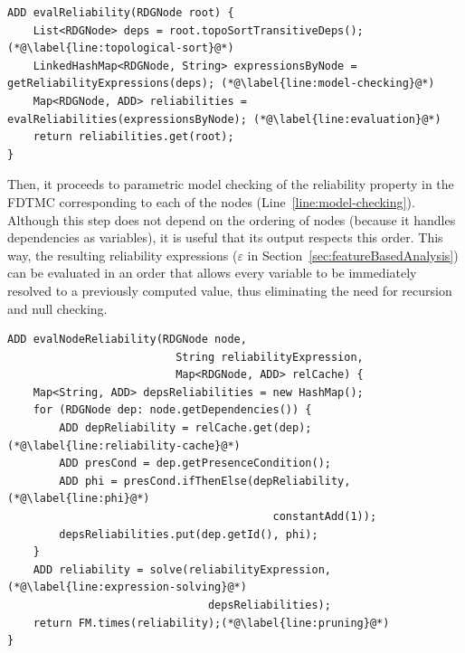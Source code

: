 \begin{lstlisting}[label={lst:evaluate-reliability},
                   caption={\textsc{ReAna}'s main evaluation routine},
                   float,
                   breaklines,
		   belowcaptionskip=0.1cm]
ADD evalReliability(RDGNode root) {
    List<RDGNode> deps = root.topoSortTransitiveDeps(); (*@\label{line:topological-sort}@*)
    LinkedHashMap<RDGNode, String> expressionsByNode = getReliabilityExpressions(deps); (*@\label{line:model-checking}@*)
    Map<RDGNode, ADD> reliabilities = evalReliabilities(expressionsByNode); (*@\label{line:evaluation}@*)
    return reliabilities.get(root);
}
\end{lstlisting}

Then, it proceeds to parametric model checking of the reliability property in
the FDTMC corresponding to each of the nodes (Line~\ref{line:model-checking}).
Although this step does not depend on the ordering of nodes (because it handles
dependencies as variables), it is useful that its output respects this order.
This way, the resulting reliability expressions ($\varepsilon$ in
Section~\ref{sec:featureBasedAnalysis}) can be evaluated in an order that
allows every variable to be immediately resolved to a previously computed value,
thus eliminating the need for recursion and null checking.


\begin{lstlisting}[label={lst:node-reliability}, 
                   caption={Evaluation of the reliability function for a single node},
                   float,
		   belowcaptionskip=0.1cm] 
ADD evalNodeReliability(RDGNode node,
                          String reliabilityExpression,
                          Map<RDGNode, ADD> relCache) {
    Map<String, ADD> depsReliabilities = new HashMap();
    for (RDGNode dep: node.getDependencies()) {
        ADD depReliability = relCache.get(dep);(*@\label{line:reliability-cache}@*)
        ADD presCond = dep.getPresenceCondition();
        ADD phi = presCond.ifThenElse(depReliability,(*@\label{line:phi}@*)
                                         constantAdd(1));
        depsReliabilities.put(dep.getId(), phi);
    }
    ADD reliability = solve(reliabilityExpression,(*@\label{line:expression-solving}@*)
                               depsReliabilities);
    return FM.times(reliability);(*@\label{line:pruning}@*)
}
\end{lstlisting}


